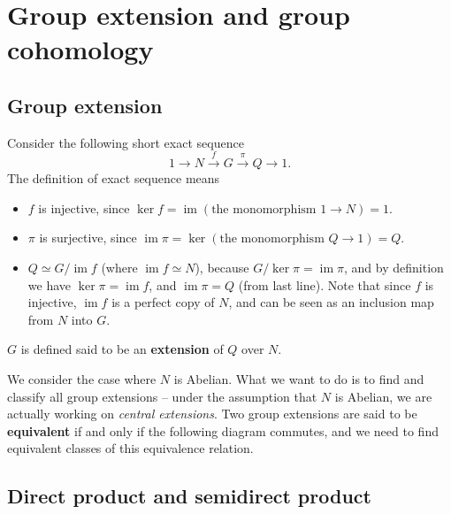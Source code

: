 \documentclass[hyperref, a4paper]{article}
\newcommand*{\concept}[1]{{\textbf{#1}}}
\DeclareMathOperator{\im}{im}
\begin{document}
\section{Group extension and group cohomology}

\subsection{Group extension}

Consider the following short exact sequence
\begin{equation}
    1 \to N \stackrel{f}{\to} G \stackrel{\pi}{\to} Q \to 1.
    \label{eq:short-exact-sequence-group}
\end{equation}
The definition of exact sequence means 
\begin{itemize}
    \item $f$ is injective, since $\ker f = \im (\text{the monomorphism $1 \to N$}) = 1$.
    \item $\pi$ is surjective, since $\im \pi = \ker (\text{the monomorphism $Q \to 1$}) = Q$.
    \item $Q \simeq G / \im{f}$ (where $\im{f} \simeq N$), because $G / \ker \pi = \im \pi$, and by definition we have $\ker \pi = \im f$,
    and $\im \pi = Q$ (from last line). Note that since $f$ is injective, $\im f$ is a perfect copy of $N$,
    and can be seen as an inclusion map from $N$ into $G$.
\end{itemize}
$G$ is defined said to be an \concept{extension} of $Q$ over $N$. 

We consider the case where $N$ is Abelian. What we want to do is to find and classify all group extensions
-- under the assumption that $N$ is Abelian, we are actually working on \emph{central extensions}. 
Two group extensions are said to be \concept{equivalent} if and only if the following diagram 
 commutes, and we need to find equivalent classes of 
this equivalence relation.

\subsection{Direct product and semidirect product}
\end{document}

